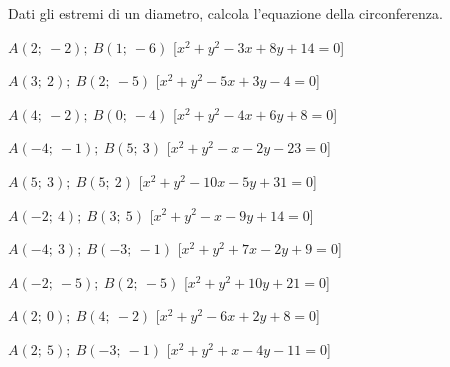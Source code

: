 \begin{esercizio}\label{ese:}
 Dati gli estremi di un diametro, calcola l'equazione della circonferenza.
 \begin{enumeratea}
  \item  \(A \left (2;~-2 \right );~B \left (1;~-6 \right )\)
   \hfill [\(x^2 + y^2 -3x +8y +14 = 0\)]
  \item  \(A \left (3;~2 \right );~B \left (2;~-5 \right )\)
   \hfill [\(x^2 + y^2 -5x +3y -4 = 0\)]
  \item  \(A \left (4;~-2 \right );~B \left (0;~-4 \right )\)
   \hfill [\(x^2 + y^2 -4x +6y +8 = 0\)]
  \item  \(A \left (-4;~-1 \right );~B \left (5;~3 \right )\)
   \hfill [\(x^2 + y^2 -x -2y -23 = 0\)]
  \item  \(A \left (5;~3 \right );~B \left (5;~2 \right )\)
   \hfill [\(x^2 + y^2 -10x -5y +31 = 0\)]
  \item  \(A \left (-2;~4 \right );~B \left (3;~5 \right )\)
   \hfill [\(x^2 + y^2 -x -9y +14 = 0\)]
  \item  \(A \left (-4;~3 \right );~B \left (-3;~-1 \right )\)
   \hfill [\(x^2 + y^2 +7x -2y +9 = 0\)]
  \item  \(A \left (-2;~-5 \right );~B \left (2;~-5 \right )\)
   \hfill [\(x^2 + y^2 +10y +21 = 0\)]
  \item  \(A \left (2;~0 \right );~B \left (4;~-2 \right )\)
   \hfill [\(x^2 + y^2 -6x +2y +8 = 0\)]
  \item  \(A \left (2;~5 \right );~B \left (-3;~-1 \right )\)
   \hfill [\(x^2 + y^2 +x -4y -11 = 0\)]
 \end{enumeratea}
\end{esercizio}


